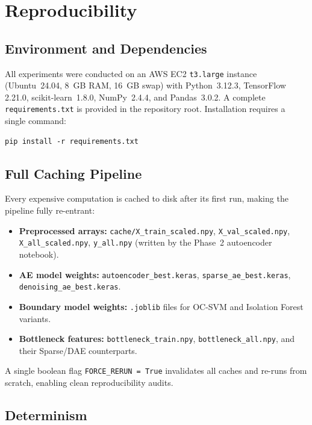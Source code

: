 \documentclass[10pt,conference]{IEEEtran}
\begin{document}
\section{Reproducibility}
\label{sec:repro}

\subsection{Environment and Dependencies}

All experiments were conducted on an AWS EC2 \texttt{t3.large} instance
(Ubuntu~24.04, 8~GB RAM, 16~GB swap) with Python~3.12.3, TensorFlow
2.21.0, scikit-learn~1.8.0, NumPy~2.4.4, and Pandas~3.0.2.  A
complete \texttt{requirements.txt} is provided in the repository root.
Installation requires a single command:
\begin{verbatim}
pip install -r requirements.txt
\end{verbatim}

\subsection{Full Caching Pipeline}

Every expensive computation is cached to disk after its first run,
making the pipeline fully re-entrant:
\begin{itemize}[leftmargin=*,noitemsep]
  \item \textbf{Preprocessed arrays:} \texttt{cache/X\_train\_scaled.npy},
        \texttt{X\_val\_scaled.npy}, \texttt{X\_all\_scaled.npy},
        \texttt{y\_all.npy} (written by the Phase~2 autoencoder notebook).
  \item \textbf{AE model weights:} \texttt{autoencoder\_best.keras},
        \texttt{sparse\_ae\_best.keras}, \texttt{denoising\_ae\_best.keras}.
  \item \textbf{Boundary model weights:} \texttt{.joblib} files for
        OC-SVM and Isolation Forest variants.
  \item \textbf{Bottleneck features:} \texttt{bottleneck\_train.npy},
        \texttt{bottleneck\_all.npy}, and their Sparse/DAE counterparts.
\end{itemize}
A single boolean flag \texttt{FORCE\_RERUN = True} invalidates all
caches and re-runs from scratch, enabling clean reproducibility audits.

\subsection{Determinism}
\end{document}
